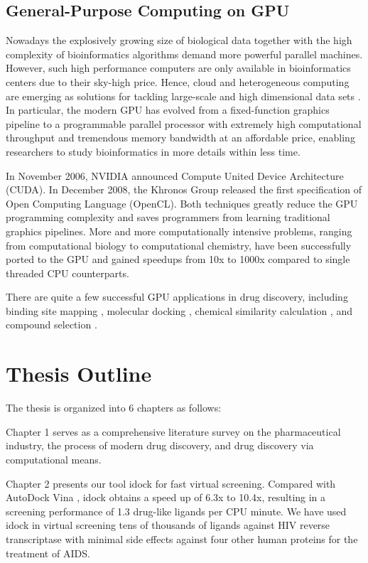 \subsection{General-Purpose Computing on GPU}

Nowadays the explosively growing size of biological data together with the high complexity of bioinformatics algorithms demand more powerful parallel machines. However, such high performance computers are only available in bioinformatics centers due to their sky-high price. Hence, cloud and heterogeneous computing are emerging as solutions for tackling large-scale and high dimensional data sets \citep{269,267,268}. In particular, the modern GPU has evolved from a fixed-function graphics pipeline to a programmable parallel processor with extremely high computational throughput and tremendous memory bandwidth at an affordable price, enabling researchers to study bioinformatics in more details within less time.

In November 2006, NVIDIA announced Compute United Device Architecture (CUDA). In December 2008, the Khronos Group released the first specification of Open Computing Language (OpenCL). Both techniques greatly reduce the GPU programming complexity and saves programmers from learning traditional graphics pipelines. More and more computationally intensive problems, ranging from computational biology to computational chemistry, have been successfully ported to the GPU and gained speedups from 10x to 1000x compared to single threaded CPU counterparts.

There are quite a few successful GPU applications in drug discovery, including binding site mapping \citep{722}, molecular docking \citep{723,652,779}, chemical similarity calculation \citep{726}, and compound selection \citep{750}.

\section{Thesis Outline}

The thesis is organized into 6 chapters as follows:

Chapter 1 serves as a comprehensive literature survey on the pharmaceutical industry, the process of modern drug discovery, and drug discovery via computational means.

Chapter 2 presents our tool idock for fast virtual screening. Compared with AutoDock Vina \citep{595}, idock obtains a speed up of 6.3x to 10.4x, resulting in a screening performance of 1.3 drug-like ligands per CPU minute. We have used idock in virtual screening tens of thousands of ligands against HIV reverse transcriptase with minimal side effects against four other human proteins for the treatment of AIDS.

